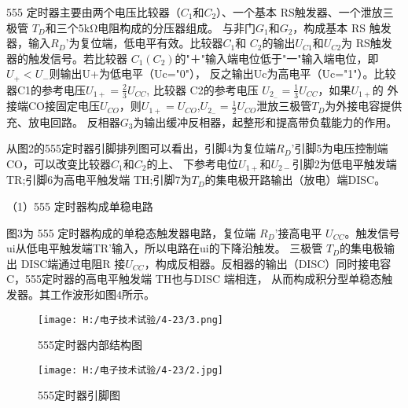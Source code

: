 \documentclass{article}
\begin{document}
      555 定时器主要由两个电压比较器（$C_1$和$C_2$）、一个基本 RS触发器、一个泄放三极管 $T_D$和三个5kΩ电阻构成的分压器组成。
      与非门$G_1$和$G_2$，构成基本 RS 触发器，输入$R_D$'为复位端，低电平有效。比较器$C_1$和 $C_2$的输出$U_{C1}$和$U_{C2}$为
       RS触发器的触发信号。若比较器 $C_1(C_2)$的"＋"输入端电位低于"一"输入端电位，即 $U_+<U_-$则输出U+为低电平（Uc="0"），
       反之输出Uc为高电平（Uc="1"）。比较器C1的参考电压$U_{1+} =\frac{2}{3} U_{CC}$,
      比较器 C2的参考电压 $U_{2_-}=\frac{1}{3}U_{CC}$，如果$U_{1+}$的
      外接端CO接固定电压$U_{CO}$，则$U_{1+} =U_{CO}$,$U_{2_-}=\frac{1}{2}U_{CO}$泄放三极管$T_D$为外接电容提供充、放电回路。
      反相器$G_3$为输出缓冲反相器，起整形和提高带负载能力的作用。\par
      从图2的555定时器引脚排列图可以看出，引脚4为复位端$R_D$'引脚5为电压控制端CO，可以改变比较器$C_1$和$C_2$的上、
      下参考电位$U_{1+}$和$U_{2-}$引脚2为低电平触发端TR;引脚6为高电平触发端 TH;引脚7为$T_D$的集电极开路输出（放电）端DISC。\par
（1）555 定时器构成单稳电路\par
图3为 555 定时器构成的单稳态触发器电路，复位端 $R_D$'接高电平 $U_{CC}$。触发信号ui从低电平触发端TR'输入，所以电路在ui的下降沿触发。
三极管 $T_D$的集电极输出 DISC端通过电阻R 接$U_{CC}$，构成反相器。反相器的输出（DISC）同时接电容 C，555定时器的高电平触发端 TH也与DISC 端相连，
从而构成积分型单稳态触发器。其工作波形如图4所示。\par

\begin{figure}[h]
    \begin{minipage}[t]{0.5\linewidth} %
      \centering   
      \texttt{[image: H:/电子技术试验/4-23/3.png]}   
      \caption{555定时器内部结构图}   
      \label{fig:side:a}   
    \end{minipage}%
    \begin{minipage}[t]{0.5\linewidth}   
      \centering   
      \texttt{[image: H:/电子技术试验/4-23/2.jpg]}   
      \caption{555定时器引脚图}   
      \label{fig:side:b}   
    \end{minipage}   
  \end{figure}
\end{document}
